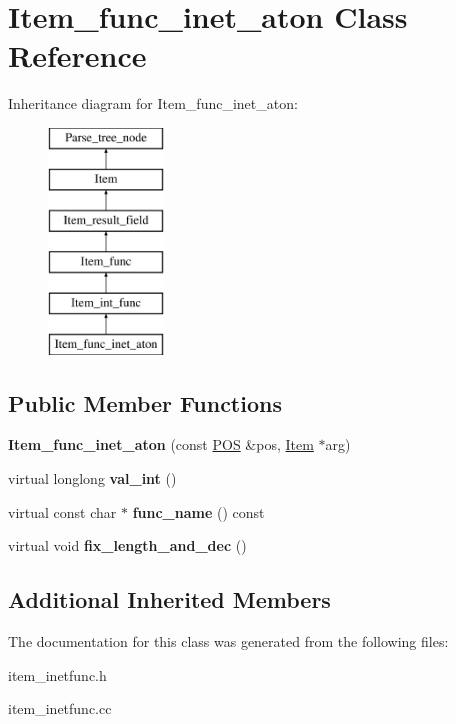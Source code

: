 \hypertarget{classItem__func__inet__aton}{}\section{Item\+\_\+func\+\_\+inet\+\_\+aton Class Reference}
\label{classItem__func__inet__aton}
Inheritance diagram for Item\+\_\+func\+\_\+inet\+\_\+aton\+:\begin{figure}[H]
\begin{center}
\leavevmode
\includegraphics[height=6.000000cm]{classItem__func__inet__aton}
\end{center}
\end{figure}
\subsection*{Public Member Functions}
\begin{DoxyCompactItemize}
\item 
\mbox{\label{classItem__func__inet__aton_a753f63644c4f2244486031252ce777b7}} 
{\bfseries Item\+\_\+func\+\_\+inet\+\_\+aton} (const \mbox{\hyperlink{structYYLTYPE}{P\+OS}} \&pos, \mbox{\hyperlink{classItem}{Item}} $\ast$arg)
\item 
\mbox{\label{classItem__func__inet__aton_a591b9c75866ec5163c7f6263ab5b8fc5}} 
virtual longlong {\bfseries val\+\_\+int} ()
\item 
\mbox{\label{classItem__func__inet__aton_accbc9a65b9e93f64983a7f2cd1a7baa6}} 
virtual const char $\ast$ {\bfseries func\+\_\+name} () const
\item 
\mbox{\label{classItem__func__inet__aton_ad2e512b9dcc0c0e209be3f3453a6f9d8}} 
virtual void {\bfseries fix\+\_\+length\+\_\+and\+\_\+dec} ()
\end{DoxyCompactItemize}
\subsection*{Additional Inherited Members}


The documentation for this class was generated from the following files\+:\begin{DoxyCompactItemize}
\item 
item\+\_\+inetfunc.\+h\item 
item\+\_\+inetfunc.\+cc\end{DoxyCompactItemize}
